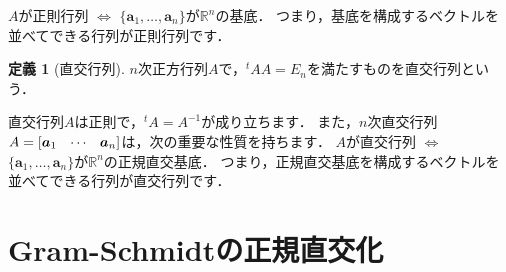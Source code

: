 \documentclass[dvipdfmx]{jsarticle}
\theoremstyle{definition}
\newtheorem{definition}{定義}[section]
\newcommand{\tp}[1]{{}^{t}#1}
\newcommand{\hs}[1]{\hspace{#1em}}
\newcommand{\hv}[3]{[#1 \hs{0.8} #2 \hs{0.8} #3]}
\begin{document}
$A$が正則行列 $\Leftrightarrow$ $\{ \bm{a}_1, \ldots, \bm{a}_n \}$が$\mathbb{R}^n$の基底．
つまり，基底を構成するベクトルを並べてできる行列が正則行列です．
\begin{definition}[直交行列]
    $n$次正方行列$A$で，$\tp{A} A = E_n$を満たすものを直交行列という．
\end{definition}
直交行列$A$は正則で，$\tp{A} = A^{-1}$が成り立ちます．
また，$n$次直交行列$A = \hv{\bm{a}_1}{\cdots}{\bm{a}_n}$は，次の重要な性質を持ちます．
$A$が直交行列 $\Leftrightarrow$ $\{ \bm{a}_1, \ldots, \bm{a}_n \}$が$\mathbb{R}^n$の正規直交基底．
つまり，正規直交基底を構成するベクトルを並べてできる行列が直交行列です．



\section{Gram-Schmidtの正規直交化}  \label{sec_gson}

\end{document}
